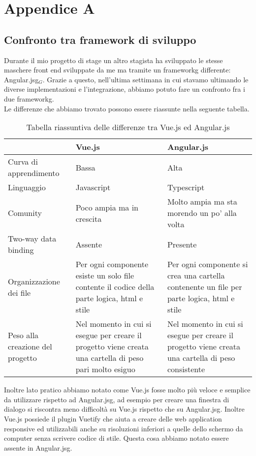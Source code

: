 
\chapter{Appendice A}

\section{Confronto tra framework di sviluppo}

Durante il mio progetto di stage un altro stagista ha sviluppato le stesse maschere front end sviluppate da me ma tramite un \gls{frameworkg} differente: \gls{Angular.jsg}$_G$. Grazie a questo, nell'ultima settimana in cui stavamo ultimando le diverse implementazioni e l'integrazione, abbiamo potuto fare un confronto fra i due \gls{frameworkg}.\\
Le differenze che abbiamo trovato possono essere riassunte nella seguente tabella.

\begin{table}[H]
	\caption{Tabella riassuntiva delle differenze tra Vue.js ed Angular.js}
	\label{tab:confronto-framework}
	\renewcommand{\arraystretch}{1.6}
	\begin{tabularx}{\textwidth}{lX|X}
		\hline\hline
		\textbf{} & \textbf{Vue.js} & \textbf{Angular.js}\\
		\hline
		Curva di apprendimento & Bassa & Alta \\
		\hline
		Linguaggio & Javascript & Typescript \\
		\hline
		Comunity & Poco ampia ma in crescita & Molto ampia ma sta morendo un po' alla volta \\
		\hline
		Two-way data binding & Assente & Presente \\
		\hline
		Organizzazione dei file & Per ogni componente esiste un solo file contente il codice della parte logica, html e stile & Per ogni componente si crea una cartella contenente un file per parte logica, html e stile \\
		\hline
		Peso alla creazione del progetto & Nel momento in cui si esegue per creare il progetto viene creata una cartella di peso pari molto esiguo & Nel momento in cui si esegue per creare il progetto viene creata una cartella di peso consistente \\
		\hline
	\end{tabularx}
\end{table}%

Inoltre lato pratico abbiamo notato come Vue.js fosse molto più veloce e semplice da utilizzare rispetto ad \gls{Angular.jsg}, ad esempio per creare una finestra di dialogo si riscontra meno difficoltà su Vue.js rispetto che su \gls{Angular.jsg}.
Inoltre Vue.js possiede il plugin Vuetify che aiuta a creare delle web application responsive ed utilizzabili anche su risoluzioni inferiori a quelle dello schermo da computer senza scrivere codice di stile. Questa cosa abbiamo notato essere assente in \gls{Angular.jsg}.



